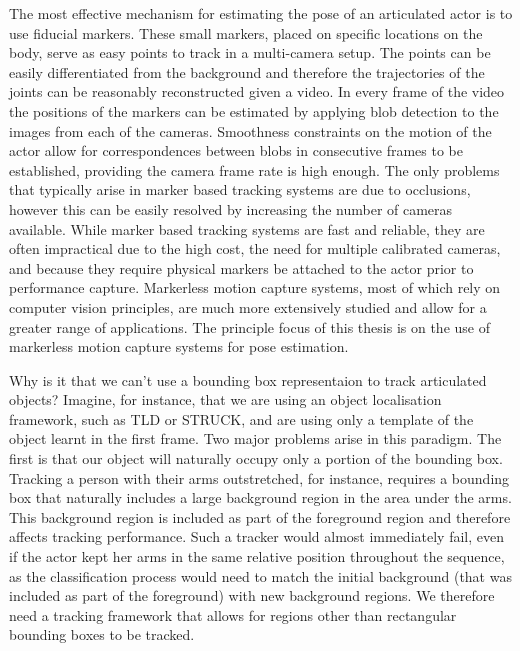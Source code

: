 The most effective mechanism for estimating the pose of an articulated actor is to use fiducial markers. These small markers, placed on specific locations on the body, serve as easy points to track in a multi-camera setup. The points can be easily differentiated from the background and therefore the trajectories of the joints can be reasonably reconstructed given a video. In every frame of the video the positions of the markers can be estimated by applying blob detection to the images from each of the cameras. Smoothness constraints on the motion of the actor allow for correspondences between blobs in consecutive frames to be established, providing the camera frame rate is high enough. The only problems that typically arise in marker based tracking systems are due to occlusions, however this can be easily resolved by increasing the number of cameras available. While marker based tracking systems are fast and reliable, they are often impractical due to the high cost, the need for multiple calibrated cameras, and because they require physical markers be attached to the actor prior to performance capture. Markerless motion capture systems, most of which rely on computer vision principles, are much more extensively studied and allow for a greater range of applications. The principle focus of this thesis is on the use of markerless motion capture systems for pose estimation. 

Why is it that we can't use a bounding box representaion to track articulated objects? Imagine, for instance, that we are using an object localisation framework, such as TLD or STRUCK, and are using only a template of the object learnt in the first frame. Two major problems arise in this paradigm. The first is that our object will naturally occupy only a portion of the bounding box. Tracking a person with their arms outstretched, for instance, requires a bounding box that naturally includes a large background region in the area under the arms. This background region is included as part of the foreground region and therefore affects tracking performance. Such a tracker would almost immediately fail, even if the actor kept her arms in the same relative position throughout the sequence, as the classification process would need to match the initial background (that was included as part of the foreground) with new background regions. We therefore need a tracking framework that allows for regions other than rectangular bounding boxes to be tracked. 


